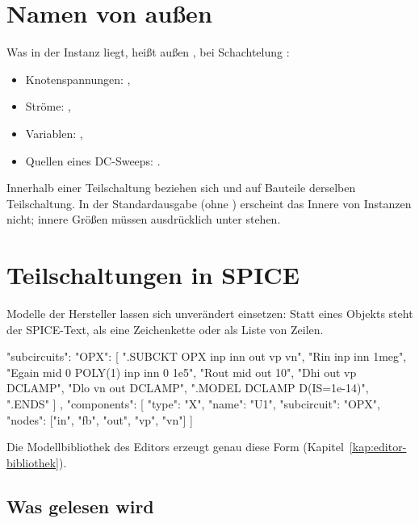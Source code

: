 \section{Namen von außen}

Was in der Instanz  liegt, heißt außen , bei
Schachtelung :

\begin{itemize}
  \item Knotenspannungen: ,
  \item Ströme: ,
  \item Variablen: ,
  \item Quellen eines DC-Sweeps: .
\end{itemize}

Innerhalb einer Teilschaltung beziehen sich  und
 auf Bauteile derselben Teilschaltung. In der Standardausgabe
(ohne ) erscheint das Innere von Instanzen nicht; innere
Größen müssen ausdrücklich unter  stehen.

\section{Teilschaltungen in SPICE}
\label{sec:spice-subckt}

Modelle der Hersteller lassen sich unverändert einsetzen: Statt eines
Objekts steht der SPICE-Text, als eine Zeichenkette oder als Liste von
Zeilen.

\begin{json}
"subcircuits": {
  "OPX": [
    ".SUBCKT OPX inp inn out vp vn",
    "Rin inp inn 1meg",
    "Egain mid 0 POLY(1) inp inn 0 1e5",
    "Rout mid out 10",
    "Dhi out vp DCLAMP",
    "Dlo vn out DCLAMP",
    ".MODEL DCLAMP D(IS=1e-14)",
    ".ENDS"
  ]
},
"components": [
  { "type": "X", "name": "U1", "subcircuit": "OPX", "nodes": ["in", "fb", "out", "vp", "vn"] }
]
\end{json}

Die Modellbibliothek des Editors erzeugt genau diese Form
(Kapitel~\ref{kap:editor-bibliothek}).

\subsection*{Was gelesen wird}

